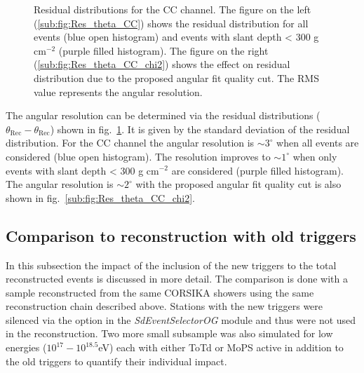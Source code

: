 \begin{figure}[h!]
  \centering
  \hfill
  \caption{Residual distributions for the CC channel. The figure on the left (\ref{sub:fig:Res_theta_CC}) shows the residual distribution for all events (blue open histogram) and events with slant depth < 300 g cm$^{-2}$ (purple filled histogram). The figure on the right (\ref{sub:fig:Res_theta_CC_chi2}) shows the effect on residual distribution due to the proposed angular fit quality cut. The RMS value represents the angular resolution.}
  \label{fig:Res_Theta}
\end{figure}

The angular resolution can be determined via the residual distributions ($\theta_{\text{Rec}} - \theta_{\text{Rec}}$) shown in fig.~\ref{fig:Res_Theta}. It is given by the standard deviation of the residual distribution. For the CC channel the angular resolution is $\sim 3^{\circ}$ when all events are considered (blue open histogram). The resolution improves to $\sim 1^{\circ}$ when only events with slant depth < 300 g cm$^{-2}$ are considered (purple filled histogram). The angular resolution is $\sim 2^{\circ}$ with the proposed angular fit quality cut is also shown in fig.~\ref{sub:fig:Res_theta_CC_chi2}. 

\subsection{Comparison to reconstruction with old triggers}
\label{subsec:old_trig_comp}
In this subsection the impact of the inclusion of the new triggers to the total reconstructed events is discussed in more detail. The comparison is done with a sample reconstructed from the same CORSIKA showers using the same reconstruction chain described above. Stations with the new triggers were silenced via the option in the \textit{SdEventSelectorOG} module and thus were not used in the reconstruction. Two more small subsample was also simulated for low energies ($10^{17}-10^{18.5}$eV) each with either ToTd or MoPS active in addition to the old triggers to quantify their individual impact. 


